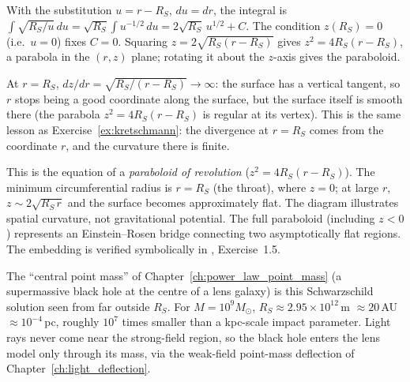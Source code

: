 \begin{derivation}
With the substitution $u = r - R_S$, $du = dr$, the integral is
$\int \sqrt{R_S/u}\,du = \sqrt{R_S}\int u^{-1/2}\,du = 2\sqrt{R_S}\,u^{1/2} + C$.
The condition $z(R_S) = 0$ (i.e.\ $u = 0$) fixes $C = 0$. Squaring
$z = 2\sqrt{R_S(r - R_S)}$ gives $z^2 = 4R_S(r - R_S)$, a parabola in the $(r, z)$ plane;
rotating it about the $z$-axis gives the paraboloid.
\end{derivation}

\begin{annotation}
At $r = R_S$, $dz/dr = \sqrt{R_S/(r - R_S)} \to \infty$: the surface has a vertical tangent, so
$r$ stops being a good coordinate along the surface, but the surface itself is smooth
there (the parabola $z^2 = 4R_S(r - R_S)$ is regular at its vertex). This is the same lesson as
Exercise~\ref{ex:kretschmann}: the divergence at $r = R_S$ comes from the coordinate $r$, and the
curvature there is finite.
\end{annotation}

This is the equation of a \emph{paraboloid of revolution} ($z^2 = 4 R_S (r - R_S)$).
The minimum circumferential radius is $r = R_S$ (the throat), where $z = 0$;
at large $r$, $z \sim 2\sqrt{R_S\, r}$ and the surface becomes approximately flat.
The diagram illustrates spatial curvature, not gravitational potential.
The full paraboloid (including $z < 0$) represents an Einstein--Rosen bridge
connecting two asymptotically flat regions.
The embedding is verified symbolically in
, Exercise~1.5.

\begin{bridge}
The ``central point mass'' of Chapter~\ref{ch:power_law_point_mass} (a supermassive black hole
at the centre of a lens galaxy) is this Schwarzschild solution seen from far outside $R_S$. For
$M = 10^{9}M_\odot$, $R_S \approx 2.95\times10^{12}$\,m $\approx 20$\,AU $\approx 10^{-4}$\,pc,
roughly $10^{7}$ times smaller than a kpc-scale impact parameter. Light rays never come near the
strong-field region, so the black hole enters the lens model only through its mass, via the
weak-field point-mass deflection of Chapter~\ref{ch:light_deflection}.
\end{bridge}
